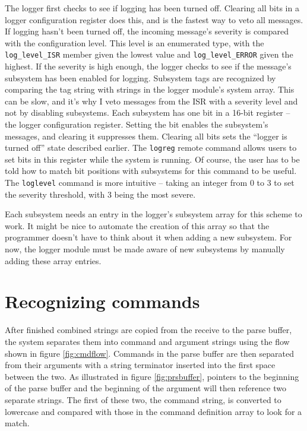 The logger first checks to see if logging has been turned off.  Clearing all bits in a logger configuration register does this, and is the fastest way to veto all messages.  If logging hasn't been turned off, the incoming message's severity is compared with the configuration level.  This level is an enumerated type, with the \texttt{log\_level\_ISR} member given the lowest value and \texttt{log\_level\_ERROR} given the highest.  If the severity is high enough, the logger checks to see if the message's subsystem has been enabled for logging.  Subsystem tags are recognized by comparing the tag string with strings in the logger module's system array.  This can be slow, and it's why I veto messages from the ISR with a severity level and not by disabling subsystems.  Each subsystem has one bit in a 16-bit register -- the logger configuration register.  Setting the bit enables the subsystem's messages, and clearing it suppresses them.  Clearing all bits sets the ``logger is turned off'' state described earlier.  The \texttt{logreg} remote command allows users to set bits in this register while the system is running.  Of course, the user has to be told how to match bit positions with subsystems for this command to be useful.  The \texttt{loglevel} command is more intuitive -- taking an integer from 0 to 3 to set the severity threshold, with 3 being the most severe.   

Each subsystem needs an entry in the logger's subsystem array for this scheme to work.  It might be nice to automate the creation of this array so that the programmer doesn't have to think about it when adding a new subsystem.  For now, the logger module must be made aware of new subsystems by manually adding these array entries.

\clearpage{}
\section{Recognizing commands}
After finished combined strings are copied from the receive to the parse buffer, the system separates them into command and argument strings using the flow shown in figure \ref{fig:cmdflow}.  Commands in the parse buffer are then separated from their arguments with a string terminator inserted into the first space between the two.  As illustrated in figure \ref{fig:prsbuffer}, pointers to the beginning of the parse buffer and the beginning of the argument will then reference two separate strings.  The first of these two, the command string, is converted to lowercase and compared with those in the command definition array to look for a match.

